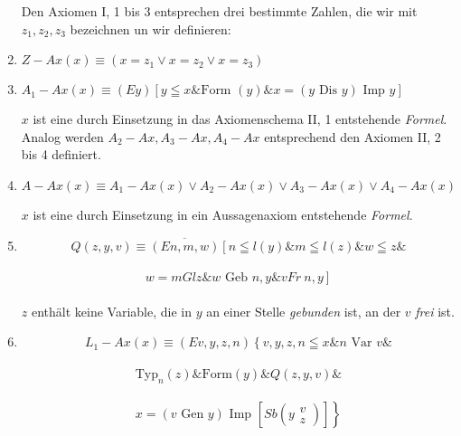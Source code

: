 \documentclass[draft]{scrartcl}
\begin{document}
\begin{enumerate}[1.]
	Den Axiomen I, 1 bis 3 entsprechen drei bestimmte Zahlen, die wir mit $z_1, z_2, z_3$ bezeichnen un wir definieren:

	\item {}$Z - Ax\left(x\right) \equiv \left(x = z_1 \lor x = z_2 \lor x = z_3\right)$

	\item $A_1 - Ax\left(x\right) \equiv \left(Ey\right) \left[y \leqq x\& \text{Form }\left(y\right) \& x = \left(y \text{ Dis } y\right) \text{ Imp } y\right]$%

	$x$ ist eine durch Einsetzung in das Axiomenschema II, 1 entstehende \textit{Formel}. Analog werden $A_2 - Ax, A_3 - Ax, A_4 - Ax$ entsprechend den Axiomen II, 2 bis 4 definiert.

	\item $A - Ax \left(x\right) \equiv A_1 - Ax\left(x\right) \lor A_2 - Ax\left(x\right) \lor A_3 - Ax\left(x\right) \lor A_4 - Ax\left(x\right)$

	$x$ ist eine durch Einsetzung in ein Aussagenaxiom entstehende \textit{Formel}.

	\item $$Q\left(z, y, v\right) \equiv \overline{\left(En, m, w\right)} \left[n \leqq l\left(y\right) \& m \leqq l\left(z\right) \& w \leqq z\right. \&
	$$\\[\spacebetweenbreakedequations]
	$$ \left.w = m Gl z \& w \text{ Geb } n, y \& v Fr\ n, y\right]$$\\[\spaceafterbreakedequation]

	$z$ enthält keine Variable, die in $y$ an einer Stelle
	\textit{gebunden} ist, an der $v$ \textit{frei} ist.

	\item $$
		L_1 - Ax\left(x\right) \equiv \left(Ev, y, z, n\right) \left\{v, y, z, n \leqq x \& n \text{ Var } v \&\right.
	$$\\[\spacebetweenbreakedequations]
	$$
		\left.\text{Typ}_n\left(z\right) \& \text{Form}\left(y\right) \& Q\left(z, y, v\right) \&\right.
	$$\\[\spacebetweenbreakedequations]
	$$
		\left.x = \left(v \text{ Gen } y\right) \text{ Imp } \left[Sb \left(y \substack{v\\z}\right)\right]\right\}
	$$\\[\spaceafterbreakedequation]


\end{enumerate}
\end{document}
